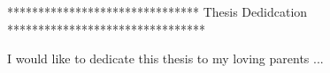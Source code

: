 
 ******************************* Thesis Dedidcation ********************************

\begin{dedication} 

I would like to dedicate this thesis to my loving parents ...

\end{dedication}
